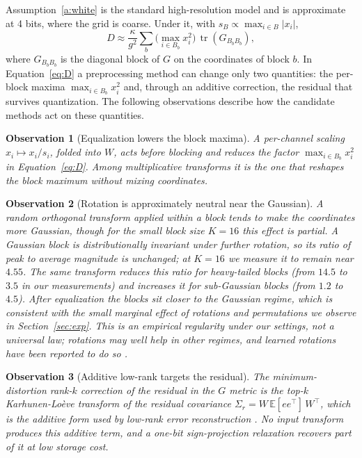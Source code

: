 \documentclass[11pt]{article}
\newtheorem{observation}{Observation}
\newcommand{\E}{\mathbb{E}}
\newcommand{\tr}{\operatorname{tr}}
\begin{document}
Assumption~\ref{a:white} is the standard high-resolution model and is approximate at
4 bits, where the grid is coarse. Under it, with $s_B \propto \max_{i\in B}|x_i|$,
\begin{equation}\label{eq:D}
  D \approx \frac{\kappa}{g^2}\sum_{b}\Big(\max_{i\in B_b} x_i^2\Big)\,\tr(G_{B_b B_b}),
\end{equation}
where $G_{B_b B_b}$ is the diagonal block of $G$ on the coordinates of block $b$. In
Equation~\eqref{eq:D} a preprocessing method can change only two quantities: the
per-block maxima $\max_{i\in B_b} x_i^2$ and, through an additive correction, the
residual that survives quantization. The following observations describe how the
candidate methods act on these quantities.

\begin{observation}[Equalization lowers the block maxima]\label{obs:eq}
A per-channel scaling $x_i \mapsto x_i / s_i$, folded into $W$, acts before blocking and
reduces the factor $\max_{i\in B_b} x_i^2$ in Equation~\eqref{eq:D}. Among
multiplicative transforms it is the one that reshapes the block maximum without mixing
coordinates.
\end{observation}

\begin{observation}[Rotation is approximately neutral near the Gaussian]\label{obs:rot}
A random orthogonal transform applied within a block tends to make the coordinates more
Gaussian, though for the small block size $K=16$ this effect is partial. A Gaussian
block is distributionally invariant under further rotation, so its ratio of peak to
average magnitude is unchanged; at $K=16$ we measure it to remain near $4.55$. The same
transform reduces this ratio for heavy-tailed blocks (from $14.5$ to $3.5$ in our
measurements) and increases it for sub-Gaussian blocks (from $1.2$ to $4.5$). After
equalization the blocks sit closer to the Gaussian regime, which is consistent with the
small marginal effect of rotations and permutations we observe in
Section~\ref{sec:exp}. This is an empirical regularity under our settings, not a
universal law; rotations may well help in other regimes, and learned rotations have
been reported to do so \cite{liu2024spinquant}.
\end{observation}

\begin{observation}[Additive low-rank targets the residual]\label{obs:lr}
The minimum-distortion rank-$k$ correction of the residual in the $G$ metric is the
top-$k$ Karhunen-Lo\`eve transform of the residual covariance
$\Sigma_r = W\,\E[ee^\top]\,W^\top$, which is the additive form used by low-rank error
reconstruction \cite{zhang2024lqer}. No input transform produces this additive term,
and a one-bit sign-projection relaxation recovers part of it at low storage cost.
\end{observation}
\end{document}
